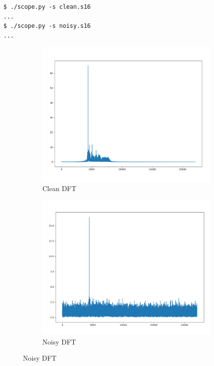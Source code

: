 \documentclass[a4paper]{article}
\begin{document}
\begin{lstlisting}
$ ./scope.py -s clean.s16
...
$ ./scope.py -s noisy.s16
...
\end{lstlisting}

\begin{figure}[H]
    \centering
    \begin{subfigure}[b]{0.45\textwidth}
        \includegraphics[width=1\textwidth]{dft_clean.png}
        \caption{\label{fig:dft_clean}Clean DFT}
    \end{subfigure}
    \begin{subfigure}[b]{0.45\textwidth}
        \includegraphics[width=1\textwidth]{dft_noisy.png}
        \caption{\label{fig:dft_noisy}Noisy DFT}
    \end{subfigure}
\end{figure}
\end{document}
